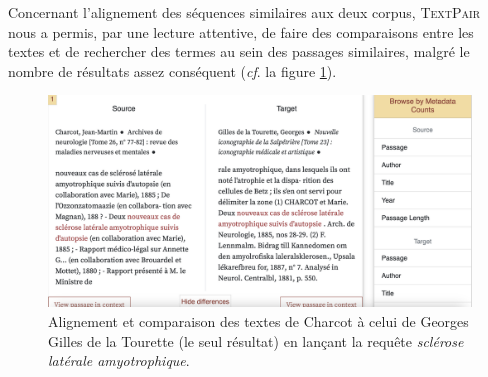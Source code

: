 Concernant l'alignement des séquences similaires aux deux corpus, \textsc{TextPair} nous a permis, par une lecture attentive, de faire des comparaisons entre les textes et de rechercher des termes au sein des passages similaires, malgré le nombre de résultats assez conséquent (\textit{cf}. la figure \ref{fig:textpair}).

\begin{figure}[!h]
    \centering
    \includegraphics[width=1\textwidth]{img/textpair.png}
    \caption{Alignement et comparaison des textes de Charcot à celui de Georges Gilles de la Tourette (le seul résultat) en lançant la requête \textit{sclérose latérale amyotrophique}.}
    \label{fig:textpair}
\end{figure}
